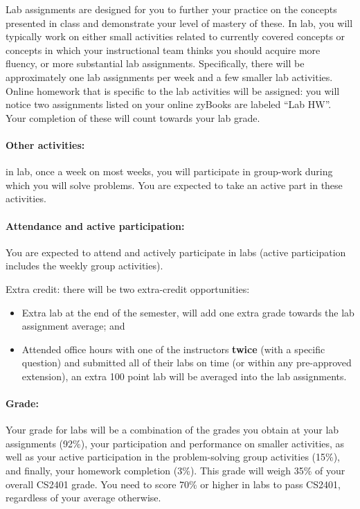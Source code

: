 \documentclass[12pt]{scrartcl}
\begin{document}
Lab assignments are designed for you to further your practice on the concepts presented in class and demonstrate your level of mastery of these. 
In lab, you will typically work on either small activities related to currently covered concepts or concepts in which your instructional team thinks you should acquire more fluency, or more substantial lab assignments. 
Specifically, there will be approximately one lab assignments per week and a few smaller lab activities. 
Online homework that is specific to the lab activities will be assigned: you will notice two assignments listed on your online zyBooks are labeled “Lab HW”. 
Your completion of these will count towards your lab grade. 

\paragraph{Other activities:} in lab, once a week on most weeks, you will participate in group-work during which you will solve problems. 
You are expected to take an active part in these activities.

\paragraph{Attendance and active participation:} You are expected to attend and actively participate in labs (active participation includes the weekly group activities). 

Extra credit: there will be two extra-credit opportunities: 
\begin{itemize}
\item Extra lab at the end of the semester, will add one extra grade towards the lab assignment average; and 
\item Attended office hours with one of the instructors \textbf{twice} (with a specific question) and submitted all of their labs on time (or within any pre-approved extension), an extra 100 point lab will be averaged into the lab assignments.
\end{itemize}

\paragraph{Grade:} Your grade for labs will be a combination of the grades you obtain at your lab assignments (92\%), your participation and performance on smaller activities, as well as your active participation in the problem-solving group activities (15\%), and finally, your homework completion (3\%). 
This grade will weigh 35\% of your overall CS2401 grade. 
You need to score 70\% or higher in labs to pass CS2401, regardless of your average otherwise.
\end{document}
